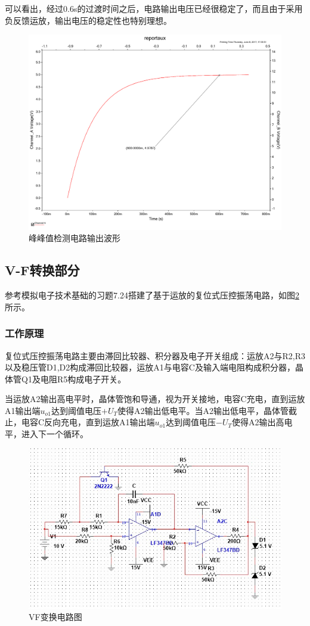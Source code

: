 \documentclass[UTF8,a4paper,landscape,16pt]{paper}
\begin{document}
\begin{multicols}{4}
\noindent 可以看出，经过0.6s的过渡时间之后，电路输出电压已经很稳定了，而且由于采用负反馈运放，输出电压的稳定性也特别理想。
\begin{figure}[H]
\centering
\includegraphics[width=\columnwidth]{f4.pdf}
\caption{峰峰值检测电路输出波形}
\label{f4}
\end{figure}

\subsection{V-F转换部分}
\noindent 参考模拟电子技术基础的习题7.24搭建了基于运放的复位式压控振荡电路，如图\ref{f5}所示。

\subsubsection{工作原理}
\noindent 复位式压控振荡电路主要由滞回比较器、积分器及电子开关组成：运放A2与R2,R3以及稳压管D1,D2构成滞回比较器，运放A1与电容C及输入端电阻构成积分器，晶体管Q1及电阻R5构成电子开关。

\noindent 当运放A2输出高电平时，晶体管饱和导通，视为开关接地，电容C充电，直到运放A1输出端$u_{o1}$达到阈值电压$+U_T$使得A2输出低电平。当A2输出低电平，晶体管截止，电容C反向充电，直到运放A1输出端$u_{o1}$达到阈值电压$-U_T$使得A2输出高电平，进入下一个循环。
\begin{figure}[H]
\centering
\includegraphics[width=\columnwidth]{f5.jpg}
\caption{VF变换电路图}
\label{f5}
\end{figure}


\end{multicols}
\end{document}
